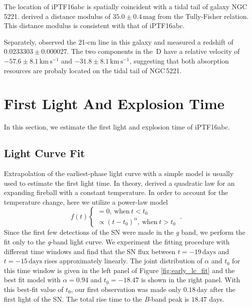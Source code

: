\documentclass[twocolumn]{aastex61}
\begin{document}
The location of iPTF16abc is spatially coincident with a tidal tail of
galaxy NGC\,5221. \citet{2007A&A...465...71T} derived a distance
modulus of $35.0\pm0.4\,\textrm{mag}$ from the Tully-Fisher
relation. This distance modulus is consistent with that of iPTF16abc.

Separately, \citet{1998A&AS..130..333T} observed the 21-cm line in
this galaxy and measured a redshift of $0.0233303\pm0.000027$.  The
two components in the \,D have a relative velocity of
$-57.6\pm8.1\,\textrm{km}\,\textrm{s}^{-1}$ and
$-31.8\pm8.1\,\textrm{km}\,\textrm{s}^{-1}$, suggesting that both
absorption resources are probaly located on the tidal tail of
NGC\,5221.


\section{First Light And Explosion Time}
\label{sec:first_light}

In this section, we estimate the first light and explosion time of
iPTF16abc.

\subsection{Light Curve Fit}
\label{sec:lc_fit}

Extrapolation of the earliest-phase light curve with a simple model is
usually used to estimate the first light time. In theory,
\citet{1982ApJ...253..785A} derived a quadratic law for an expanding
fireball with a constant temperature. In order to account for the
temperature change, here we utilize a power-law model
\begin{equation}
  \label{eq:broken_power_law}
  f(t) \left\{
    \begin{array}{ll}
      = 0,\ \textrm{when}\ t<t_0 \\
      \propto (t-t_0)^{\alpha},\ \textrm{when}\ t>t_0
    \end{array}
  \right.\ .
\end{equation}
Since the first few detections of the SN were made in the \textit{g}
band, we perform the fit only to the \textit{g}-band light curve. We
experiment the fitting procedure with different time windows and find
that the SN flux between $t=-19\,\textrm{days}$ and
$t=-15\,\textrm{days}$ rises approximately linearly. The joint
distribution of $\alpha$ and $t_0$ for this time window is given in
the left panel of Figure \ref{fig:early_lc_fit} and the best fit model
with $\alpha = 0.94$ and $t_0=-18.47$ is shown in the right
panel. With this best-fit value of $t_0$, our first observation was
made only $0.18\,\textrm{day}$ after the first light of the SN. The
total rise time to the \textit{B}-band peak is $18.47$ days.
\end{document}
